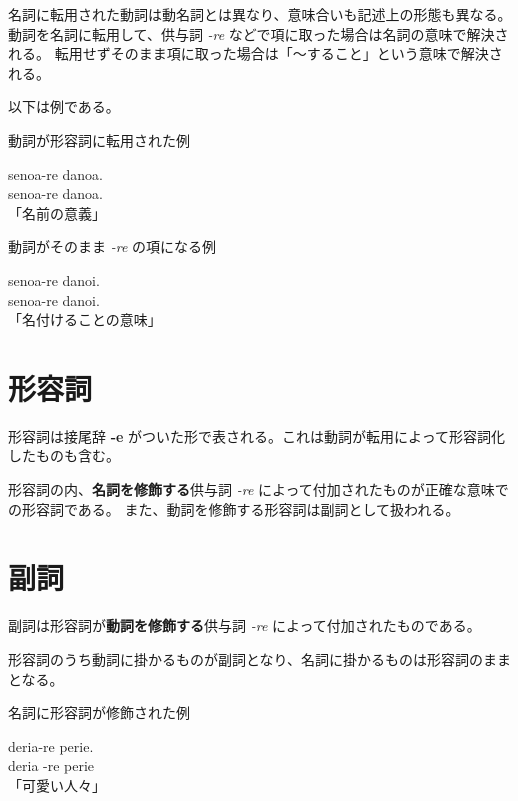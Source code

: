 名詞に転用された動詞は動名詞とは異なり、意味合いも記述上の形態も異なる。
動詞を名詞に転用して、供与詞 \emph{-re} などで項に取った場合は名詞の意味で解決される。
転用せずそのまま項に取った場合は「～すること」という意味で解決される。

以下は例である。

\begin{itembox}[l]{動詞が形容詞に転用された例}
    \begin{pindent}
        \noindent
        senoa-re danoa. \\
        senoa-re danoa. \\
        「名前の意義」
    \end{pindent}
\end{itembox}

\begin{itembox}[l]{動詞がそのまま \emph{-re} の項になる例}
    \begin{pindent}
        senoa-re danoi. \\
        senoa-re danoi. \\
        「名付けることの意味」
        \noindent
    \end{pindent}
\end{itembox}

\section{形容詞}

形容詞は接尾辞 \textbf{-e} がついた形で表される。これは動詞が転用によって形容詞化したものも含む。

形容詞の内、\textbf{名詞を修飾する}供与詞 \emph{-re} によって付加されたものが正確な意味での形容詞である。
また、動詞を修飾する形容詞は副詞として扱われる。

\section{副詞}

副詞は形容詞が\textbf{動詞を修飾する}供与詞 \emph{-re} によって付加されたものである。

形容詞のうち動詞に掛かるものが副詞となり、名詞に掛かるものは形容詞のままとなる。

\begin{itembox}[l]{名詞に形容詞が修飾された例}
    \begin{pindent}
        \noindent
        deria-re perie. \vspace{-1mm} \\
        deria -re perie \vspace{-1mm} \\
        「可愛い人々」
    \end{pindent}
\end{itembox}

